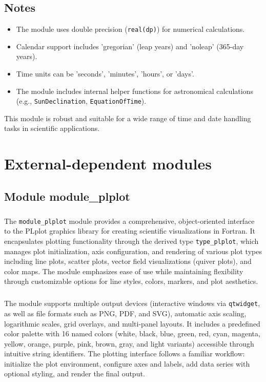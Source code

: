 \documentclass[12pt,a4paper]{report}
\begin{document}
\section{Notes}
\begin{itemize}
\item The module uses double precision (\texttt{real(dp)}) for numerical calculations.
\item Calendar support includes 'gregorian' (leap years) and 'noleap' (365-day years).
\item Time units can be 'seconds', 'minutes', 'hours', or 'days'.
\item The module includes internal helper functions for astronomical calculations (e.g., \texttt{SunDeclination}, \texttt{EquationOfTime}).
\end{itemize}

This module is robust and suitable for a wide range of time and date handling tasks in scientific applications.

\chapter{External-dependent modules}

\section{Module module\_plplot}

\paragraph{} 
The \texttt{module\_plplot} module provides a comprehensive, object-oriented interface to the PLplot graphics library for creating scientific visualizations in Fortran. It encapsulates plotting functionality through the derived type \texttt{type\_plplot}, which manages plot initialization, axis configuration, and rendering of various plot types including line plots, scatter plots, vector field visualizations (quiver plots), and color maps. The module emphasizes ease of use while maintaining flexibility through customizable options for line styles, colors, markers, and plot aesthetics.

\paragraph{}
The module supports multiple output devices (interactive windows via \texttt{qtwidget}, as well as file formats such as PNG, PDF, and SVG), automatic axis scaling, logarithmic scales, grid overlays, and multi-panel layouts. It includes a predefined color palette with 16 named colors (white, black, blue, green, red, cyan, magenta, yellow, orange, purple, pink, brown, gray, and light variants) accessible through intuitive string identifiers. The plotting interface follows a familiar workflow: initialize the plot environment, configure axes and labels, add data series with optional styling, and render the final output.
\end{document}
